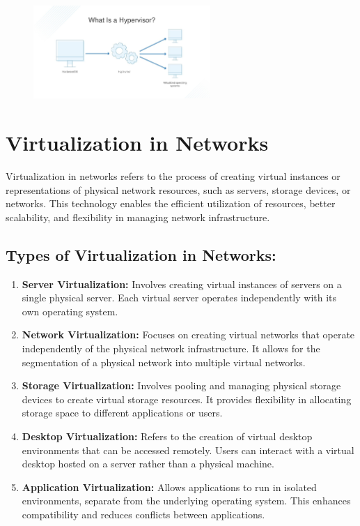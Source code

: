 \documentclass{report}
\begin{document}
\begin{figure}[h] 
    \centering 
    \includegraphics[width=0.6\textwidth]{1.jpg}
\end{figure} 


\section*{Virtualization in Networks}

Virtualization in networks refers to the process of creating virtual instances or representations of physical network resources, such as servers, storage devices, or networks.
This technology enables the efficient utilization of resources, better scalability, and flexibility in managing network infrastructure.\cite{4}

\subsection*{Types of Virtualization in Networks:}

\begin{enumerate}
  \item \textbf{Server Virtualization:}
    Involves creating virtual instances of servers on a single physical server. Each virtual server operates independently with its own operating system.

  \item \textbf{Network Virtualization:}
    Focuses on creating virtual networks that operate independently of the physical network infrastructure. It allows for the segmentation of a physical network into multiple virtual networks.

  \item \textbf{Storage Virtualization:}
    Involves pooling and managing physical storage devices to create virtual storage resources. It provides flexibility in allocating storage space to different applications or users.

  \item \textbf{Desktop Virtualization:}
    Refers to the creation of virtual desktop environments that can be accessed remotely. Users can interact with a virtual desktop hosted on a server rather than a physical machine.

  \item \textbf{Application Virtualization:}
    Allows applications to run in isolated environments, separate from the underlying operating system. This enhances compatibility and reduces conflicts between applications.
\end{enumerate}
\end{document}
